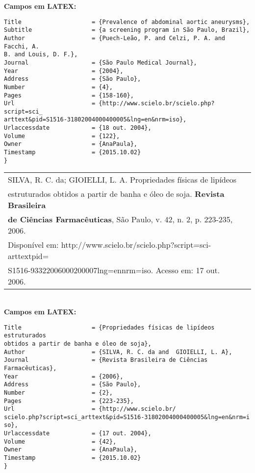 \textbf{Campos em LATEX:} 

\begin{verbatim}
Title                    = {Prevalence of abdominal aortic aneurysms},
Subtitle                 = {a screening program in São Paulo, Brazil},
Author                   = {Puech-Leão, P. and Celzi, P. A. and Facchi, A. 
B. and Louis, D. F.},
Journal                  = {São Paulo Medical Journal},
Year                     = {2004},
Address                  = {São Paulo},
Number                   = {4},
Pages                    = {158-160},
Url                      = {http://www.scielo.br/scielo.php?script=sci_
arttext&pid=S1516-31802004000400005&lng=en&nrm=iso},
Urlaccessdate            = {18 out. 2004},
Volume                   = {122},
Owner                    = {AnaPaula},
Timestamp                = {2015.10.02}
}
\end{verbatim}

\begin{tabular}{|l|c|} \hline
	SILVA, R. C. da; GIOIELLI, L. A. Propriedades físicas de lipídeos \\estruturados obtidos a partir de banha e óleo de soja. \textbf{Revista Brasileira} \\\textbf{de Ciências Farmacêuticas}, São Paulo, v. 42, n. 2, p. 223-235, 2006.\\
	Disponível em: http://www.scielo.br/scielo.php?script=sci-arttextpid=\\
	S1516-93322006000200007lng=ennrm=iso. Acesso em: 17 out. 2006. \\\hline
\end{tabular} \\

\textbf{Campos em LATEX:} 

\begin{verbatim}
Title                    = {Propriedades físicas de lipídeos estruturados
obtidos a partir de banha e óleo de soja},
Author                   = {SILVA, R. C. da and  GIOIELLI, L. A},
Journal                  = {Revista Brasileira de Ciências
Farmacêuticas},
Year                     = {2006},
Address                  = {São Paulo},
Number                   = {2},
Pages                    = {223-235},
Url                      = {http://www.scielo.br/
scielo.php?script=sci_arttext&pid=S1516-31802004000400005&lng=en&nrm=i
so},
Urlaccessdate            = {17 out. 2004},
Volume                   = {42},
Owner                    = {AnaPaula},
Timestamp                = {2015.10.02}
}
\end{verbatim}

